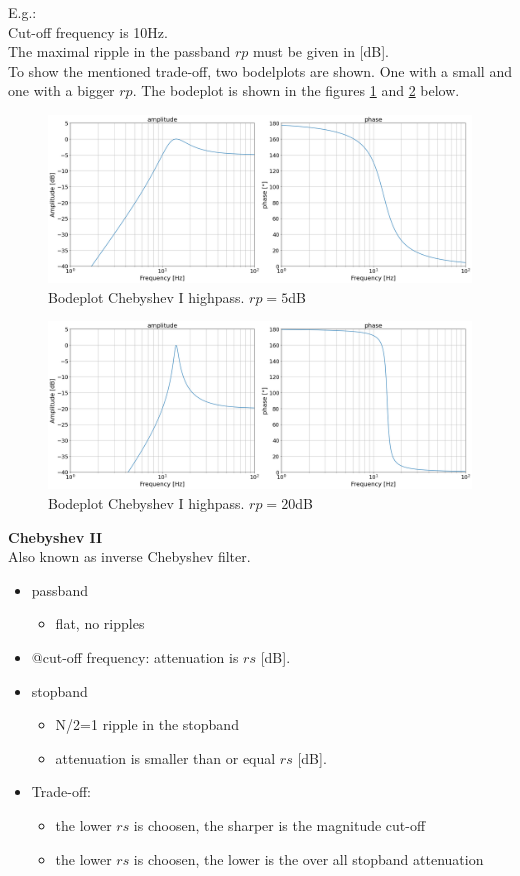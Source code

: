 E.g.: \\
Cut-off frequency is 10Hz.\\
The maximal ripple in the passband $rp$ must be given in [dB].\\
To show the mentioned trade-off, two bodelplots are shown. One with a small and one with a bigger $rp$.
The bodeplot is shown in the figures \ref{fig:hp_cheby1_1} and \ref{fig:hp_cheby1_2} below.
\begin{figure}[h!]
  \centering
  \includegraphics[width=.75\linewidth]{hp_cheby1_5dB.png}
  \caption{Bodeplot Chebyshev I highpass. $rp=5$dB}
  \label{fig:hp_cheby1_1}
\end{figure}

\begin{figure}[h!]
  \centering
  \includegraphics[width=.75\linewidth]{hp_cheby1_20dB.png}
  \caption{Bodeplot Chebyshev I highpass. $rp=20$dB}
  \label{fig:hp_cheby1_2}
\end{figure}

\textbf{Chebyshev II}\\
Also known as inverse Chebyshev filter.\\
\begin{itemize}
    \item passband
    \begin{itemize}
         \item flat, no ripples 
    \end{itemize}
    \item @cut-off frequency: attenuation is $rs$ [dB].
    \item stopband
    \begin{itemize}
        \item N/2=1 ripple in the stopband
        \item attenuation is smaller than or equal $rs$ [dB].
    \end{itemize}
    \item Trade-off:
    \begin{itemize}
        \item the lower $rs$ is choosen, the sharper is the magnitude cut-off
        \item the lower $rs$ is choosen, the lower is the over all stopband attenuation
    \end{itemize}
\end{itemize}

